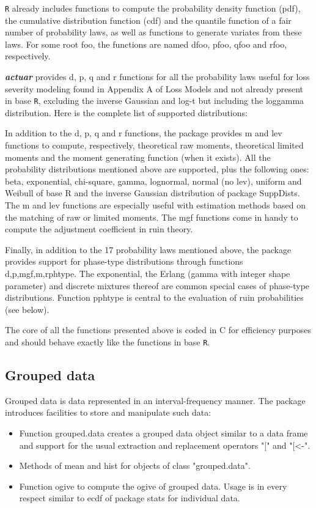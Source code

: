 \documentclass[12pt]{article}
\begin{document}
\texttt{R} already includes functions to compute the probability density function (pdf), the cumulative distribution function (cdf) and the quantile function of a fair number of probability laws, as well as functions to generate variates from these laws. For some root foo, the functions are named dfoo, pfoo, qfoo and rfoo, respectively.

\textbf{\textit{actuar}} provides d, p, q and r functions for all the probability laws useful for loss severity modeling found in Appendix A of Loss Models and not already present in base \texttt{R}, excluding the inverse Gaussian and log-t but including the loggamma distribution. Here is the complete list of supported distributions:



In addition to the d, p, q and r functions, the package provides m and lev functions to compute, respectively, theoretical raw moments, theoretical limited moments and the moment generating function (when it exists). All the probability distributions mentioned above are supported, plus the following ones: beta, exponential, chi-square, gamma, lognormal, normal (no lev), uniform and Weibull of base R and the inverse Gaussian distribution of package SuppDists. The m and lev functions are especially useful with estimation methods based on the matching of raw or limited moments. The mgf functions come in handy to compute the adjustment coefficient in ruin theory.

Finally, in addition to the 17 probability laws mentioned above, the package provides support for phase-type distributions through functions {d,p,mgf,m,r}phtype. The exponential, the Erlang (gamma with integer shape parameter) and discrete mixtures thereof are common special cases of phase-type distributions. Function pphtype is central to the evaluation of ruin probabilities (see below).

The core of all the functions presented above is coded in C for efficiency purposes and should behave exactly like the functions in base \texttt{R}.

\subsection{Grouped data}

Grouped data is data represented in an interval-frequency manner. The package introduces facilities to store and manipulate such data:
\begin{itemize}
\item Function grouped.data creates a grouped data object similar to a data frame and support for the usual extraction and replacement operators "[" and "[<-".
\item Methods of mean and hist for objects of class "grouped.data".
\item Function ogive to compute the ogive of grouped data. Usage is in every respect similar to ecdf of package stats for individual data.
\end{itemize}
\end{document}
